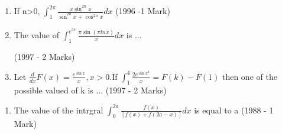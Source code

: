 \documentclass[journal,12pt,twocolumn]{IEEEtran}
\theoremstyle{remark}
\begin{document}
\begin{enumerate}
\item If n>0, $\int_1^{2\pi} \frac {x \sin ^{2n}x}{\sin ^{2n} x + \cos ^{2n} x} dx $
\hfill{(1996 -1 Mark)}\\
		
\item The value of $\int_1^{e^{37}} \frac {\pi \sin (\pi lnx)}{x} dx$ is ...

\hfill{(1997 - 2 Marks)}\\
		
\item Let $\frac {d}{dx}F(x)=\frac {e^{\sin x}}{x},x>0$.If $\int_1^4 \frac{2e^{\sin x^2}}{x}=F(k)-F(1)$ then one of the possible valued of k is ...
\hfill{(1997 - 2 Marks)}\\
\end{enumerate}
\begin{enumerate}
\item The value of the intrgral $\int_0^{2a} \frac{f(x)}{[f(x)+f(2a-x)]}dx$ is equal to a
\hfill{(1988 - 1 Mark)}\\
\end{enumerate}
\end{document}
